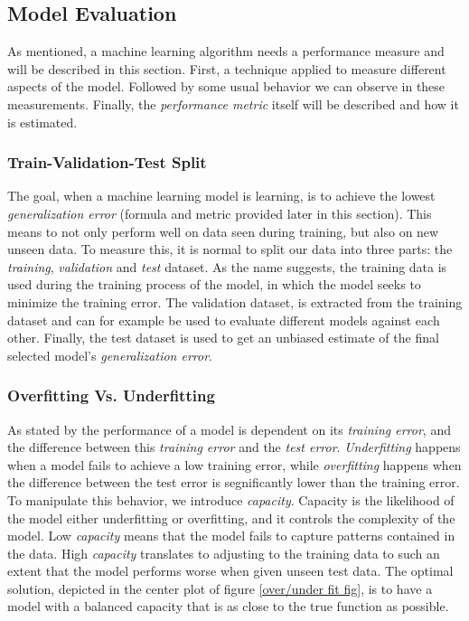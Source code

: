     \subsection{Model Evaluation}
    As mentioned, a machine learning algorithm needs a performance measure and will be described in this section. First, a technique applied to measure different aspects of the model. Followed by some usual behavior we can observe in these measurements. Finally, the \textit{performance metric} itself will be described and how it is estimated. 
    
    \subsubsection{Train-Validation-Test Split}
        The goal, when a machine learning model is learning, is to achieve the lowest \textit{generalization error}\cite{Goodfellow-et-al-2016_generalization} (formula and metric provided later in this section). This means to not only perform well on data seen during training, but also on new unseen data. To measure this, it is normal to split our data into three parts\cite{Goodfellow-et-al-2016_train_val_test_split}: the \textit{training}, \textit{validation} and \textit{test} dataset. As the name suggests, the training data is used during the training process of the model, in which the model seeks to minimize the training error. The validation dataset, is extracted from the training dataset and can for example be used to evaluate different models against each other. Finally, the test dataset is used to get an unbiased estimate of the final selected model's \textit{generalization error}.
        
    
    \subsubsection{Overfitting Vs. Underfitting}
        As stated by \citeauthor{Goodfellow-et-al-2016}\cite{Goodfellow-et-al-2016} the performance of a model is dependent on its \textit{training error}, and the difference between this \textit{training error} and the \textit{test error}. \textit{Underfitting} happens when a model fails to achieve a low training error, while \textit{overfitting} happens when the difference between the test error is segnificantly lower than the training error. To manipulate this behavior, we introduce \textit{capacity}. Capacity is the likelihood of the model either underfitting or overfitting, and it controls the complexity of the model.  Low \textit{capacity} means that the model fails to capture patterns contained in the data. High \textit{capacity} translates to adjusting to the training data to such an extent that the model performs worse when given unseen test data. The optimal solution, depicted in the center plot of figure \ref{over/under fit fig}, is to have a model with a balanced capacity that is as close to the true function as possible. 
        
